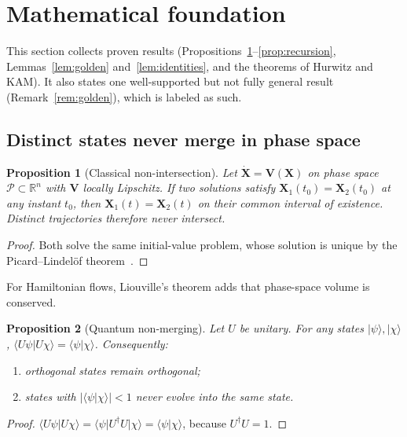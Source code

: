 \documentclass[11pt]{article}
\newtheorem{proposition}{Proposition}
\theoremstyle{definition}
\theoremstyle{remark}
\begin{document}
\section{Mathematical foundation}\label{sec:math}

This section collects proven results (Propositions~\ref{prop:classical}--\ref{prop:recursion}, Lemmas~\ref{lem:golden} and~\ref{lem:identities}, and the theorems of Hurwitz and KAM). It also states one well-supported but not fully general result (Remark~\ref{rem:golden}), which is labeled as such.

\subsection{Distinct states never merge in phase space}

\begin{proposition}[Classical non-intersection]\label{prop:classical}
Let $\dot{\mathbf X} = \mathbf V(\mathbf X)$ on phase space $\mathcal P \subset \mathbb R^{n}$ with $\mathbf V$ locally Lipschitz. If two solutions satisfy $\mathbf X_1(t_0) = \mathbf X_2(t_0)$ at any instant $t_0$, then $\mathbf X_1(t) = \mathbf X_2(t)$ on their common interval of existence. Distinct trajectories therefore never intersect.
\end{proposition}
\begin{proof}
Both solve the same initial-value problem, whose solution is unique by the Picard--Lindel\"of theorem~\cite{ArnoldODE}.
\end{proof}

For Hamiltonian flows, Liouville's theorem adds that phase-space volume is conserved.

\begin{proposition}[Quantum non-merging]\label{prop:quantum}
Let $U$ be unitary. For any states $|\psi\rangle, |\chi\rangle$, $\langle U\psi | U\chi\rangle = \langle\psi|\chi\rangle$. Consequently:
\begin{enumerate}
\item[(i)] orthogonal states remain orthogonal;
\item[(ii)] states with $|\langle\psi|\chi\rangle| < 1$ never evolve into the same state.
\end{enumerate}
\end{proposition}
\begin{proof}
$\langle U\psi|U\chi\rangle = \langle \psi|U^\dagger U|\chi\rangle = \langle\psi|\chi\rangle$, because $U^\dagger U = 1$.
\end{proof}
\end{document}
